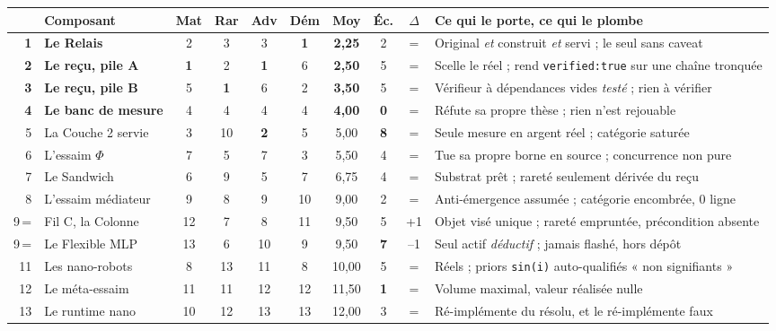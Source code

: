 \documentclass[10pt]{article}
\newcommand{\code}[1]{\texttt{\small #1}}
\newcommand{\best}[1]{{\color{green}\textbf{#1}}}
\newcommand{\sz}[1]{{\small\color{grey}\textsf{#1}}}
\begin{document}
\renewcommand{\arraystretch}{1.1}
\begin{center}\small
\begin{tabular}{@{}r>{\raggedright\arraybackslash}p{3.2cm}cccc c c c >{\raggedright\arraybackslash}p{5.4cm}@{}}
\toprule
& \textbf{Composant} & \sz{Mat} & \sz{Rar} & \sz{Adv} & \sz{Dém} & \textbf{Moy} & \sz{Éc.} & \sz{$\Delta$} & \textbf{Ce qui le porte, ce qui le plombe} \\
\midrule
\textbf{1} & \textbf{Le Relais} & 2 & 3 & 3 & \best{1} & \textbf{2,25} & 2 & \sz{=} & Original \emph{et} construit \emph{et} servi ; le seul sans caveat \\
\textbf{2} & \textbf{Le reçu, pile A} & \best{1} & 2 & \best{1} & 6 & \textbf{2,50} & 5 & \sz{=} & Scelle le réel ; rend \code{verified:true} sur une chaîne tronquée \\
\textbf{3} & \textbf{Le reçu, pile B} & 5 & \best{1} & 6 & 2 & \textbf{3,50} & 5 & \sz{=} & Vérifieur à dépendances vides \emph{testé} ; rien à vérifier \\
\textbf{4} & \textbf{Le banc de mesure} & 4 & 4 & 4 & 4 & \textbf{4,00} & \best{0} & \sz{=} & Réfute sa propre thèse ; rien n'est rejouable \\
5 & La Couche 2 servie & 3 & 10 & \best{2} & 5 & 5,00 & \textbf{8} & \sz{=} & Seule mesure en argent réel ; catégorie saturée \\
6 & L'essaim $\Phi$ & 7 & 5 & 7 & 3 & 5,50 & 4 & \sz{=} & Tue sa propre borne en source ; concurrence non pure \\
7 & Le Sandwich & 6 & 9 & 5 & 7 & 6,75 & 4 & \sz{=} & Substrat prêt ; rareté seulement dérivée du reçu \\
8 & L'essaim médiateur & 9 & 8 & 9 & 10 & 9,00 & 2 & \sz{=} & Anti-émergence assumée ; catégorie encombrée, 0 ligne \\
9\,= & Fil C, la Colonne & 12 & 7 & 8 & 11 & 9,50 & 5 & \sz{+1} & Objet visé unique ; rareté empruntée, précondition absente \\
9\,= & Le Flexible MLP & 13 & 6 & 10 & 9 & 9,50 & \textbf{7} & \sz{--1} & Seul actif \emph{déductif} ; jamais flashé, hors dépôt \\
11 & Les nano-robots & 8 & 13 & 11 & 8 & 10,00 & 5 & \sz{=} & Réels ; priors \code{sin(i)} auto-qualifiés « non signifiants » \\
12 & Le méta-essaim & 11 & 11 & 12 & 12 & 11,50 & \best{1} & \sz{=} & Volume maximal, valeur réalisée nulle \\
13 & Le runtime nano & 10 & 12 & 13 & 13 & 12,00 & 3 & \sz{=} & Ré-implémente du résolu, et le ré-implémente faux \\
\bottomrule
\end{tabular}
\end{center}
\end{document}
